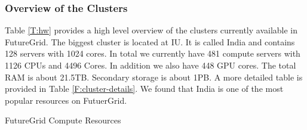 \documentclass[graybox]{svmult}
\begin{document}
\subsubsection{Overview of the Clusters}\label{S:hw-cluster} 


Table \ref{T:hw} provides a high level overview of the clusters currently available in FutureGrid.  The biggest cluster is located at IU. It is called India and contains 128 servers with 1024 cores. In total we currently have 481 compute servers with 1126 CPUs and 4496 Cores. In addition we also have 448 GPU cores. The total RAM is about 21.5TB. Secondary storage is about 1PB. A more detailed table is provided in Table \ref{F:cluster-details}. We found that India is one of the most popular resources on FutuerGrid.


\begin{table}[htb]


\caption{FutureGrid Compute Resources}\label{T:hw}



\end{table}
\end{document}
